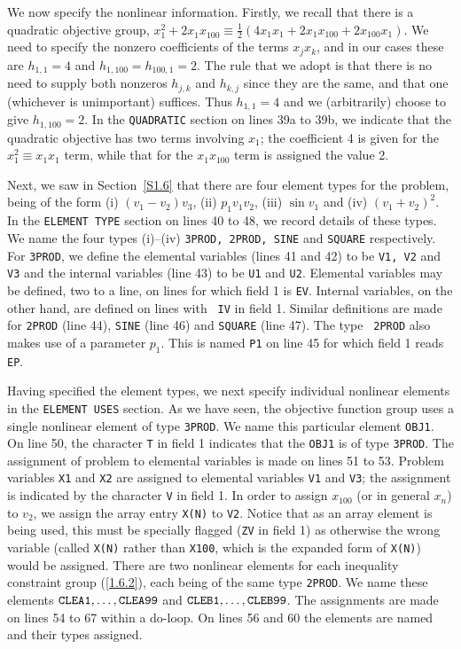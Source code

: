 \documentclass[a4paper]{article}
\newcommand{\req}[1]{(\ref{#1})}
\newcommand{\sfrac}[2]{{\scriptstyle \frac{#1}{#2}}}
\newcommand{\half}{\sfrac{1}{2}}
\begin{document}
We now specify the nonlinear information. 
Firstly, we recall that
there is a quadratic objective group,
$x_1^2 + 2 x_1^{ } x_{100}^{ } \equiv \half( 4 x_1 x_1 +
 2 x_1 x_{100} + 2 x_{100} x_1 )$. We need to specify the nonzero coefficients
of the terms $x_j x_k$, and in our cases these are
$h_{1,1} = 4$ and $h_{1,100} = h_{100,1} = 2$.
The rule that we adopt is
that there is no need to supply both nonzeros
$h_{j,k}$ and $h_{k,j}$ since they are the same, and
that one (whichever is unimportant) suffices. Thus $h_{1,1} = 4$
and we (arbitrarily) choose to give $h_{1,100} = 2$.
In the {\tt QUADRATIC} section on lines 39a to 39b, we indicate that
the quadratic objective has two terms involving
${x_1}$; the coefficient 4 is given for the
${x_1^2 \equiv x_1^{ } x_1^{ }}$ term, while that for
the ${x_1 x_{100}}$ term is assigned the value 2.

Next, we saw in Section~\ref{S1.6}
that there are four element types
for  the problem, being of  the form
(i) $(v_1 - v_2 ) v_3$, (ii) $p_1 v_1 v_2$, (iii) $\sin v_1$  and (iv)
$(v_1 + v_2  )^2$.  In  the {\tt ELEMENT  TYPE}
section on lines 40 to 48, we record details  of these types.  We name
the four  types (i)--(iv) {\tt 3PROD,  2PROD, SINE}  and  {\tt SQUARE}
respectively.   For  {\tt 3PROD},  we define  the elemental  variables
(lines 41  and 42) to be {\tt  V1, V2}  and {\tt V3}  and the internal
variables (line 43) to be {\tt U1} and  {\tt U2}.  Elemental variables
may be defined, two to a line, on lines for which field 1 is {\tt EV}.
Internal variables,
on the other hand, are defined on lines  with {\tt
IV}  in field 1.  Similar definitions  are  made for {\tt 2PROD} (line
44), {\tt SINE} (line 46)  and {\tt  SQUARE} (line  47). The type {\tt
2PROD} also makes use of a parameter $p_1$. This is named {\tt  P1}
on line 45 for which field 1 reads {\tt EP}.

Having   specified the  element  types,
we  next   specify individual
nonlinear elements
in the {\tt  ELEMENT USES}
section.  As we have seen, the objective function
group uses  a single
nonlinear element of type
{\tt 3PROD}. We name this particular element
{\tt OBJ1}.  On line 50,  the character {\tt  T}  in field 1 indicates
that the {\tt OBJ1} is of type  {\tt 3PROD}. The assignment of problem
to  elemental variables
is made on  lines  51 to 53. Problem variables
{\tt X1} and {\tt X2} are assigned to elemental variables {\tt V1} and
{\tt V3}; the assignment  is  indicated by the   character {\tt V}  in
field 1.  In order to assign $x_{100}$ (or in general $x_n$) to $v_2$,
we assign the array
entry {\tt X(N)}  to {\tt  V2}. Notice  that as an
array element is being used, this must be specially flagged  ({\tt ZV}
in field 1) as otherwise the wrong variable (called {\tt  X(N)} rather
than {\tt X100}, which is  the expanded form of  {\tt X(N)}) would be
assigned.   There are two   nonlinear  elements
for   each inequality
constraint group
\req{1.6.2}, each being of  the same type  {\tt 2PROD}. We  name these
elements
${\tt   CLEA1,\ldots,  CLEA99}$  and    ${\tt  CLEB1,\ldots,
CLEB99}$. The assignments are made on lines 54 to 67 within a do-loop.
On lines 56 and 60  the elements are named
and their  types assigned.
\end{document}
